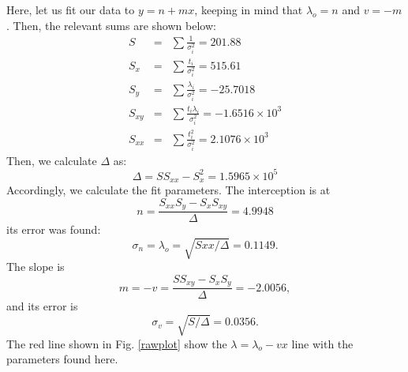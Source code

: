 \documentclass[aps,nofootinbib,onecolumn,groupedaddress,a4paper]{revtex4}
\begin{document}
Here, let us fit our data to $y = n + mx$, keeping in mind that $\lambda_o = n$ and $v = -m$. Then, the relevant sums are shown below:
\begin{eqnarray*}
S & = & \sum \frac{1}{\sigma_i^2} = 201.88 \\
S_x & = & \sum \frac{t_i}{\sigma_i^2} = 515.61 \\
S_y & = & \sum \frac{\lambda_i}{\sigma_i^2} = -25.7018 \\
S_{xy} & = & \sum \frac{t_i \lambda_i}{\sigma_i^2} = -1.6516\times10^3 \\
S_{xx} & = & \sum \frac{t_i^2}{\sigma_i^2} = 2.1076\times10^3
\end{eqnarray*}
Then, we calculate $\Delta$ as:
\[ \Delta = S S_{xx} - S_x^2 = 1.5965\times10^5 \]
Accordingly, we calculate the fit parameters. The interception is at
\[ n = \frac{S_{xx} S_y - S_x S_{xy}}{\Delta} = 4.9948 \]
its error was found:
\[ \sigma_n = \lambda_o = \sqrt{Sxx / \Delta} =  0.1149. \]
The slope is
\[
m = -v = \frac{S S_{xy} - S_x S_y}{\Delta} = -2.0056, \]
and its error is
\[ \sigma_v = \sqrt{S / \Delta} = 0.0356. \]
The red line shown in Fig. \ref{rawplot} show the $\lambda = \lambda_o - vx$ line with the parameters found here.
\end{document}
